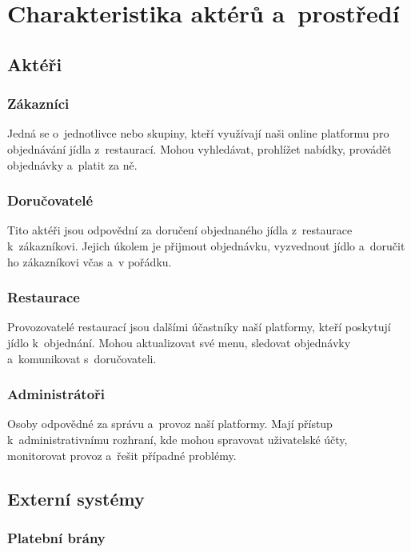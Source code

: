 \section{Charakteristika aktérů a~prostředí}

	\subsection{Aktéři}

        \subsubsection{Zákazníci} 
		
		Jedná se o~jednotlivce nebo skupiny, kteří využívají naši online platformu pro objednávání jídla z~restaurací. Mohou vyhledávat, prohlížet nabídky, provádět objednávky a~platit za ně.

        \subsubsection{Doručovatelé} 
		
		Tito aktéři jsou odpovědní za doručení objednaného jídla z~restaurace k~zákazníkovi. Jejich úkolem je přijmout objednávku, vyzvednout jídlo a~doručit ho zákazníkovi včas a~v pořádku.

        \subsubsection{Restaurace} 
		
		Provozovatelé restaurací jsou dalšími účastníky naší platformy, kteří poskytují jídlo k~objednání. Mohou aktualizovat své menu, sledovat objednávky a~komunikovat s~doručovateli.

        \subsubsection{Administrátoři} 
		
		Osoby odpovědné za správu a~provoz naší platformy. Mají přístup k~administrativnímu rozhraní, kde mohou spravovat uživatelské účty, monitorovat provoz a~řešit případné problémy.


    \subsection{Externí systémy}

        \subsubsection{Platební brány} 
		
